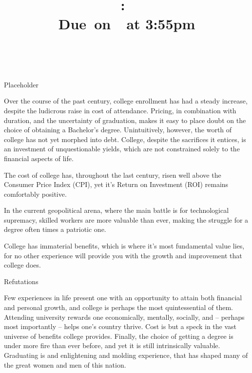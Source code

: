 \documentclass[12pt]{article}
\title{
        \vspace{2in}
        \textmd{\textbf{\hmwkClass:\ \hmwkTitle}}\\
        \normalsize\vspace{0.1in}\small{Due\ on\ \hmwkDueDate\ at 3:55pm}\\
        \vspace{0.1in}\large{\textit{\hmwkClassInstructor\ \hmwkClassTime}}
        \vspace{3in}
    }
\author{\textbf{\hmwkAuthorName}}
\date{}
\newcommand{\note}[1]{\todo{\setstretch{0.1}\footnotesize{#1}}}
\begin{document}
\maketitle
\thispagestyle{empty}
\cleardoublepage
\setcounter{page}{1}
\begin{center}
    \note{Define title}\Large{Placeholder}
    \end{center}
    \doublespacing
    
    Over the course of the past century, college enrollment has had a steady 
    increase, despite the ludicrous raise in cost of attendance. Pricing, in 
    combination with duration, and the uncertainty of graduation, makes it \note
    {Reword?}easy to place doubt on the choice of obtaining a Bachelor's 
    degree. Unintuitively, however, the worth of college has not yet morphed 
    into debt. College, despite the sacrifices it entices, is an investment of 
    unquestionable yields, which are not constrained solely to the financial 
    aspects of life.

    The cost of college has, throughout the last century, \note{Source}risen 
    well above the Consumer Price Index (CPI), yet it's Return on Investment 
    (ROI) remains comfortably positive.

    In the current geopolitical arena, where the main battle is for 
    technological supremacy, skilled workers are more valuable than ever, 
    making the struggle for a degree often times a patriotic one.

    College has immaterial benefits, which is where it's most fundamental value 
    lies, for no other experience will provide you with the growth and 
    improvement that college does.

    Refutations

    Few experiences in life present one with an opportunity to attain both 
    financial and personal growth, and college is perhaps the most 
    quintessential of them. Attending university rewards one economically, 
    mentally, socially, and -- perhaps most importantly -- helps one's country 
    thrive. Cost is but a speck in the vast universe of benefits college 
    provides. Finally, the choice of getting a degree is under more fire than 
    ever before, and yet it is still intrinsically valuable. Graduating is and 
    enlightening and molding experience, that has shaped many of the great 
    women and men of this nation.
\end{document}
